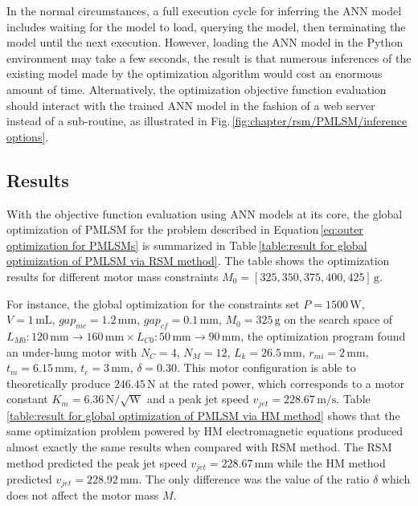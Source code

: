             
            In the normal circumstances, a full execution cycle for inferring the \acs{ANN} model includes waiting for the model to load, querying the model, then terminating the model until the next execution. However, loading the \acs{ANN} model in the Python environment may take a few seconds, the result is that numerous inferences of the existing model made by the optimization algorithm would cost an enormous amount of time. Alternatively, the optimization objective function evaluation should interact with the trained \acs{ANN} model in the fashion of a web server instead of a sub-routine, as illustrated in Fig.\,\ref{fig:chapter/rsm/PMLSM/inference options}.


        \subsection{Results}                   \label{Chapter:RSM/PMLSM/Results}


            With the objective function evaluation using \acs{ANN} models at its core, the global optimization of \acs{PMLSM} for the problem described in Equation\,\ref{eq:outer optimization for PMLSMs} is summarized in Table\,\ref{table:result for global optimization of PMLSM via RSM method}. The table shows the optimization results for different motor mass constraints $M_0=[325,350,375,400,425]\,\mathrm{g}$.
            
            
            For instance, the global optimization for the constraints set $P=1500\,\mathrm{W}$, $V=1\,\mathrm{mL}$, $gap_{mc}=1.2\,\mathrm{mm}$, $gap_{cf}=0.1\,\mathrm{mm}$, $M_0=325\,\mathrm{g}$ on the search space of $L_{M0}:120\,\mathrm{mm}\rightarrow 160\,\mathrm{mm} \times L_{C0}:50\,\mathrm{mm}\rightarrow 90\,\mathrm{mm}$, the optimization program found an under-hung motor with $N_C=4$, $N_M=12$, $L_k=26.5\,\mathrm{mm}$, $r_{mi}=2\,\mathrm{mm}$, $t_m=6.15\,\mathrm{mm}$, $t_c=3\,\mathrm{mm}$, $\delta=0.30$. This motor configuration is able to theoretically produce $246.45\,\mathrm{N}$ at the rated power, which corresponds to a motor constant $K_m=6.36\,\mathrm{N/\sqrt{W}}$ and a peak jet speed $v_{jet}=228.67\,\mathrm{m/s}$. Table\,\ref{table:result for global optimization of PMLSM via HM method} shows that the same optimization problem powered by \acs{HM} electromagnetic equations produced almost exactly the same results when compared with \acs{RSM} method. The \acs{RSM} method predicted the peak jet speed $v_{jet}=228.67\,\mathrm{mm}$ while the \acs{HM} method predicted $v_{jet}=228.92\,\mathrm{mm}$. The only difference was the value of the ratio $\delta$ which does not affect the motor mass $M$.  
            
